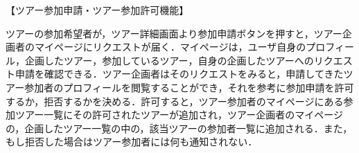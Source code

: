 【ツアー参加申請・ツアー参加許可機能】
\par
ツアーの参加希望者が，ツアー詳細画面より参加申請ボタンを押すと，ツアー企画者のマイページにリクエストが届く．マイページは，ユーザ自身のプロフィール，企画したツアー，参加しているツアー，自身の企画したツアーへのリクエスト申請を確認できる．ツアー企画者はそのリクエストをみると，申請してきたツアー参加者のプロフィールを閲覧することができ，それを参考に参加申請を許可するか，拒否するかを決める．許可すると，ツアー参加者のマイページにある参加ツアー一覧にその許可されたツアーが追加され，ツアー企画者のマイページの，企画したツアー一覧の中の，該当ツアーの参加者一覧に追加される．また，もし拒否した場合はツアー参加者には何も通知されない．
